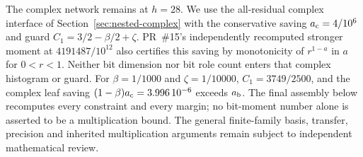 The complex network remains at $h=28$. We use the all-residual complex
interface of Section~\ref{sec:nested-complex} with the conservative saving
$a_{\rm c}=4/10^6$ and guard $C_1=3/2-\beta/2+\zeta$.
PR~\#15's independently recomputed stronger moment at
$4191487/10^{12}$ also certifies this saving by monotonicity of
$r^{1-a}$ in $a$ for $0<r<1$. Neither bit dimension nor bit role count
enters that complex histogram or guard. For $\beta=1/1000$ and
$\zeta=1/10000$, $C_1=3749/2500$, and the complex leaf saving
$(1-\beta)a_{\rm c}=3.996\,10^{-6}$ exceeds $a_{\rm b}$.
The final assembly below recomputes every constraint and every margin;
no bit-moment number alone is asserted to be a multiplication bound.
The general finite-family basis, transfer, precision and inherited
multiplication arguments remain subject to independent mathematical review.
